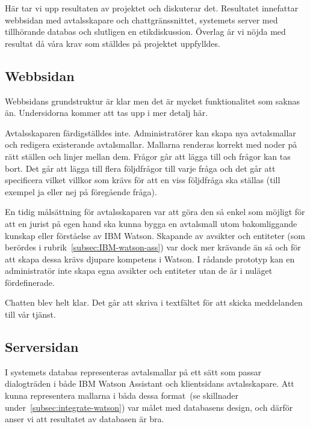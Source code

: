 \documentclass[a4paper,12pt]{article}
\begin{document}


Här tar vi upp resultaten av projektet och diskuterar det.  Resultatet innefattar webbsidan med avtalsskapare och chattgränssnittet, systemets server med tillhörande databas och slutligen en etikdiskussion. Överlag är vi nöjda med resultat då våra krav som ställdes på projektet uppfylldes.

\subsection{Webbsidan}
Webbsidans grundstruktur är klar men det är mycket funktionalitet som saknas än. Undersidorna kommer att tas upp i mer detalj här.

Avtalsskaparen färdigställdes inte. Administratörer kan skapa nya avtalsmallar och redigera existerande avtalsmallar. Mallarna renderas korrekt med noder på rätt ställen och linjer mellan dem. Frågor går att lägga till och frågor kan tas bort. Det går att lägga till flera följdfrågor till varje fråga och det går att specificera vilket villkor som krävs för att en viss följdfråga ska ställas (till exempel ja eller nej på föregående fråga).

En tidig målsättning för avtalsskaparen var att göra den så enkel som möjligt för att en jurist på egen hand ska kunna bygga en avtalsmall utom bakomliggande kunskap eller förståelse av IBM Watson. Skapande av avsikter och entiteter (som berördes i rubrik~\ref{subsec:IBM-watson-ass}) var dock mer krävande än så och för att skapa dessa krävs djupare kompetens i Watson. I rådande prototyp kan en administratör inte skapa egna avsikter och entiteter utan de är i nuläget fördefinerade. %

Chatten blev helt klar. Det går att skriva i textfältet för att skicka meddelanden till vår tjänst. 
 
\subsection{Serversidan}
I systemets databas representeras avtalsmallar på ett sätt som passar dialogträden i både IBM Watson Assistant och klientsidans avtalsskapare. Att kunna representera mallarna i båda dessa format~(se skillnader under~\ref{subsec:integrate-watson}) var målet med databasens design, och därför anser vi att resultatet av databasen är bra. 
\end{document}
